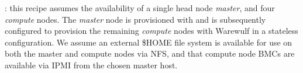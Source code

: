 : this recipe assumes the availability of a single head node
{\em master}, and four {\em compute} nodes. The {\em master} node is
provisioned with \baseOS{} and is subsequently configured to
provision the remaining {\em compute} nodes with Warewulf in a
stateless configuration. We assume an external \$HOME file system is
available for use on both the master and compute nodes via NFS, and that compute node BMCs are
available via IPMI from the chosen master host.
